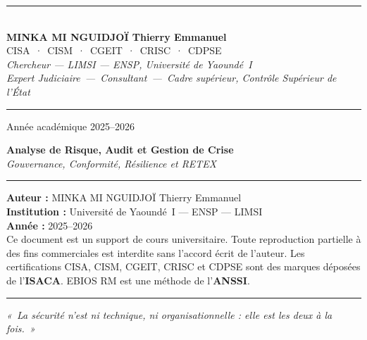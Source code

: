 \documentclass[12pt, a4paper, twoside, openright]{book}
\begin{document}
\begin{titlepage}
\vfill

\begin{center}
    {\color{CouleurAccent}\rule{0.7\linewidth}{1.2pt}}\\[1.2ex]
    {\color{white}\large\bfseries MINKA MI NGUIDJOÏ Thierry Emmanuel}\\[0.4ex]
    {\color{white!80!gray}\small
        CISA~·~CISM~·~CGEIT~·~CRISC~·~CDPSE}\\[0.3ex]
    {\color{white!70!gray}\footnotesize\itshape
        Chercheur — LIMSI — ENSP, Université de Yaoundé~I}\\[0.3ex]
    {\color{white!70!gray}\footnotesize\itshape
        Expert Judiciaire~—~Consultant~—~Cadre supérieur, Contrôle Supérieur de l'État}\\[1.2ex]
    {\color{CouleurAccent}\rule{0.7\linewidth}{1.2pt}}
\end{center}

\vspace{0.6cm}
\begin{center}
    {\color{white!60!gray}\small Année académique 2025--2026}
\end{center}

\afterpage{\nopagecolor}
\end{titlepage}

\clearpage
\thispagestyle{empty}
\vspace*{\fill}
\begin{center}
    \begin{minipage}{0.78\textwidth}
        \footnotesize\color{CouleurBordInfo}
        \begin{center}
            {\bfseries\color{CouleurPrimaire}
                Analyse de Risque, Audit et Gestion de Crise}\\[0.4ex]
            {\itshape Gouvernance, Conformité, Résilience et RETEX}
        \end{center}
        \vspace{0.8ex}\hrule\vspace{0.8ex}
        \textbf{Auteur :} MINKA MI NGUIDJOÏ Thierry Emmanuel\\
        \textbf{Institution :} Université de Yaoundé~I — ENSP — LIMSI\\
        \textbf{Année :} 2025--2026\\[0.5ex]
        Ce document est un support de cours universitaire. Toute reproduction partielle
        à des fins commerciales est interdite sans l'accord écrit de l'auteur. Les
        certifications CISA, CISM, CGEIT, CRISC et CDPSE sont des marques déposées de
        l'\textbf{ISACA}. EBIOS RM est une méthode de l'\textbf{ANSSI}.\\[0.8ex]
        \hrule\vspace{0.5ex}
        {\centering\itshape
        «~La sécurité n'est ni technique, ni organisationnelle : elle est les deux à la fois.~»}
    \end{minipage}
\end{center}
\vspace*{\fill}
\end{document}
